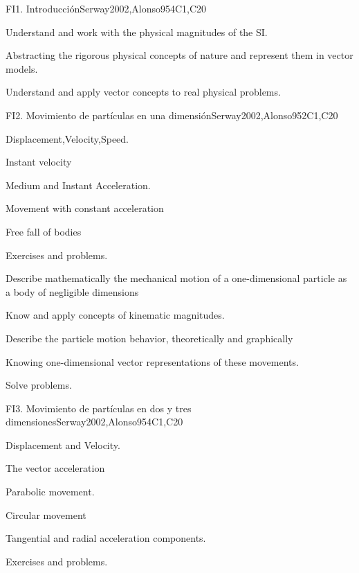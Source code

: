 \begin{syllabus}
\begin{unit}{FI1. Introducción}{}{Serway2002,Alonso95}{4}{C1,C20}
   \begin{learningoutcomes}
      \item Understand and work with the physical magnitudes of the SI.
      \item Abstracting the rigorous physical concepts of nature and represent them in vector models.
      \item Understand and apply vector concepts to real physical problems.
   \end{learningoutcomes}
\end{unit}

\begin{unit}{FI2. Movimiento de partículas en una dimensión}{}{Serway2002,Alonso95}{2}{C1,C20}
\begin{topics}
      \item Displacement,Velocity,Speed.
      \item Instant velocity
      \item Medium and Instant Acceleration.
      \item Movement with constant acceleration
      \item Free fall of bodies
      \item Exercises and problems.
    \end{topics}
   \begin{learningoutcomes}
      \item Describe mathematically the mechanical motion of a one-dimensional particle as a body of negligible dimensions
      \item Know and apply concepts of kinematic magnitudes.
      \item Describe the particle motion behavior, theoretically and graphically
      \item Knowing one-dimensional vector representations of these movements.
      \item Solve problems.
   \end{learningoutcomes}
\end{unit}

\begin{unit}{FI3. Movimiento de partículas en dos y tres dimensiones}{}{Serway2002,Alonso95}{4}{C1,C20}
\begin{topics}
      \item Displacement and Velocity.
      \item The vector acceleration
      \item Parabolic movement.
      \item Circular movement
      \item Tangential and radial acceleration components.
      \item Exercises and problems.
\end{topics}


\end{unit}
\end{syllabus}
